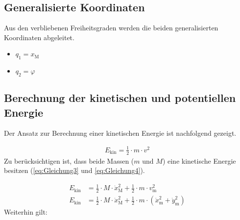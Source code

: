 \subsection{Generalisierte Koordinaten}

Aus den verbliebenen Freiheitsgraden werden die beiden generalisierten Koordinaten abgeleitet.

\begin{itemize}
    \item $q_{\mathrm{1}} = x_{\mathrm{M}}$
    \item $q_{\mathrm{2}} = \varphi$
\end{itemize}

\subsection{Berechnung der kinetischen und potentiellen Energie}

Der Ansatz zur Berechnung einer kinetischen Energie ist nachfolgend gezeigt.

\begin{align}\label{eq:Gleichung2}
    E_{\mathrm{kin}} = \frac{1}{2} \cdot m \cdot v^2
\end{align}
\newline
Zu berücksichtigen ist, dass beide Massen ($m$ und $M$) eine kinetische Energie besitzen (\autoref{eq:Gleichung3} und \autoref{eq:Gleichung4}).

\begin{align}
    E_{\mathrm{kin}} &= \frac{1}{2} \cdot M \cdot \dot{x}_{\mathrm{M}}^2 + \frac{1}{2} \cdot m \cdot v_{\mathrm{m}}^2 \label{eq:Gleichung3} \\
    E_{\mathrm{kin}} &= \frac{1}{2} \cdot M \cdot \dot{x}_{\mathrm{M}}^2 + \frac{1}{2} \cdot m \cdot \left(\dot{x}_{\mathrm{m}}^2 + \dot{y}_{\mathrm{m}}^2\right) \label{eq:Gleichung4}
\end{align}
\newline
Weiterhin gilt:

